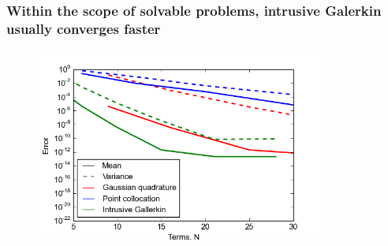 \documentclass{beamer}
\begin{document}
\begin{frame}
 \frametitle{Within the scope of solvable problems, intrusive
 Galerkin usually converges faster}
  \begin{figure}
  \includegraphics[width=0.85\textwidth]{convergence_gallerkin.png}
 \end{figure}
\end{frame}
\end{document}
